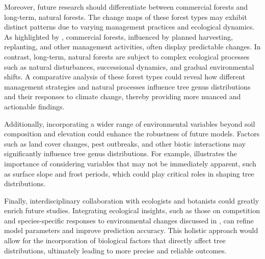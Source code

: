 Moreover, future research should differentiate between commercial forests and long-term, natural forests. The change maps of these forest types may exhibit distinct patterns due to varying management practices and ecological dynamics. As highlighted by \cite{chauvier2021}, commercial forests, influenced by planned harvesting, replanting, and other management activities, often display predictable changes. In contrast, long-term, natural forests are subject to complex ecological processes such as natural disturbances, successional dynamics, and gradual environmental shifts. A comparative analysis of these forest types could reveal how different management strategies and natural processes influence tree genus distributions and their responses to climate change, thereby providing more nuanced and actionable findings.

Additionally, incorporating a wider range of environmental variables beyond soil composition and elevation could enhance the robustness of future models. Factors such as land cover changes, pest outbreaks, and other biotic interactions may significantly influence tree genus distributions. For example, \cite{usda} illustrates the importance of considering variables that may not be immediately apparent, such as surface slope and frost periods, which could play critical roles in shaping tree distributions.

Finally, interdisciplinary collaboration with ecologists and botanists could greatly enrich future studies. Integrating ecological insights, such as those on competition and species-specific responses to environmental changes discussed in \cite{Magalhães2021}, can refine model parameters and improve prediction accuracy. This holistic approach would allow for the incorporation of biological factors that directly affect tree distributions, ultimately leading to more precise and reliable outcomes.